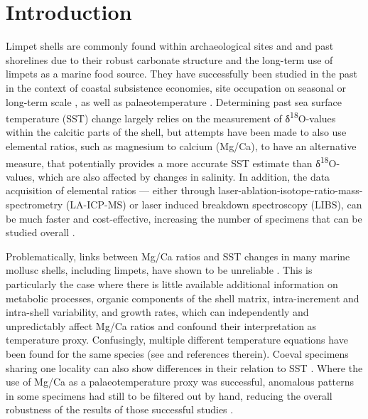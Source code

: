 \documentclass[
  authoryear,
  preprint,
  3p]{elsarticle}
\begin{document}
\section{Introduction}\label{Introduction}

Limpet shells are commonly found within archaeological sites and and
past shorelines due to their robust carbonate structure and the
long-term use of limpets as a marine food source. They have successfully
been studied in the past in the context of coastal subsistence
economies, site occupation on seasonal
\citep{Shackleton1973-ij, Parker2018-wf, Bosch2018-ud} or long-term
scale \citep{Ortiz2015-mr}, as well as palaeotemperature
\citep{Fenger2007-gf, Surge2012-ba, Wang2012-ee, Colonese2012-ct, Ferguson2011-zl}.
Determining past sea surface temperature (SST) change largely relies on
the measurement of δ\textsuperscript{18}O-values within the calcitic
parts of the shell, but attempts have been made to also use elemental
ratios, such as magnesium to calcium (Mg/Ca), to have an alternative
measure, that potentially provides a more accurate SST estimate than
δ\textsuperscript{18}O-values, which are also affected by changes in
salinity. In addition, the data acquisition of elemental ratios ---
either through laser-ablation-isotope-ratio-mass-spectrometry
(LA-ICP-MS) or laser induced breakdown spectroscopy (LIBS), can be much
faster and cost-effective, increasing the number of specimens that can
be studied overall \citep{Durham2017-fh, Hausmann2023-ih}.

Problematically, links between Mg/Ca ratios and SST changes in many
marine mollusc shells, including limpets, have shown to be unreliable
\citep{Surge2008-ri, Wanamaker2008-zl, Schone2010-yl, Freitas2012-tx, Graniero2015-zv, Poulain2015-dg, Vihtakari2017-wd}.
This is particularly the case where there is little available additional
information on metabolic processes, organic components of the shell
matrix, intra-increment and intra-shell variability, and growth rates,
which can independently and unpredictably affect Mg/Ca ratios and
confound their interpretation as temperature proxy. Confusingly,
multiple different temperature equations have been found for the same
species (see \citep{Freitas2012-tx, Vihtakari2017-wd} and references
therein). Coeval specimens sharing one locality can also show
differences in their relation to SST \citep{Hausmann2019-fi}. Where the
use of Mg/Ca as a palaeotemperature proxy was successful, anomalous
patterns in some specimens had still to be filtered out by hand,
reducing the overall robustness of the results of those successful
studies \citep{Ferguson2011-zl}.
\end{document}

